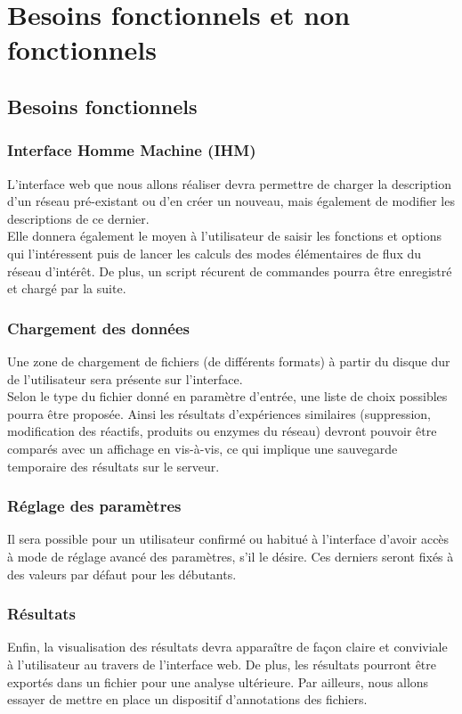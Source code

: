 \chapter{Besoins fonctionnels et non fonctionnels}

\section{Besoins fonctionnels}

\subsection{Interface Homme Machine (IHM)}
L'interface web que nous allons réaliser devra permettre de charger la description d'un réseau pré-existant ou d'en créer un nouveau, mais également de modifier les descriptions de ce dernier.\\
Elle donnera également le moyen à l'utilisateur de saisir les fonctions et options qui l'intéressent puis de lancer les calculs des modes élémentaires de flux du réseau d'intérêt. De plus, un script récurent de commandes pourra être enregistré et chargé par la suite.

\subsection{Chargement des données}
Une zone de chargement de fichiers (de différents formats) à partir du disque dur de l'utilisateur sera présente sur l'interface. \\
Selon le type du fichier donné en paramètre d'entrée, une liste de choix possibles pourra être proposée. Ainsi les résultats d'expériences similaires (suppression, modification des réactifs, produits ou enzymes du réseau) devront pouvoir être comparés avec un affichage en vis-à-vis, ce qui implique une sauvegarde temporaire des résultats sur le serveur. 

\subsection{Réglage des paramètres}
Il sera possible pour un utilisateur confirmé ou habitué à l'interface d'avoir accès à mode de réglage avancé des paramètres, s'il le désire. Ces derniers seront fixés à des valeurs par défaut pour les débutants. 

\subsection{Résultats}
Enfin, la visualisation des résultats devra apparaître de façon claire et conviviale à l'utilisateur au travers de l'interface web. De plus, les résultats pourront être exportés dans un fichier pour une analyse ultérieure. Par ailleurs, nous allons essayer de mettre en place un dispositif d'annotations des fichiers.

